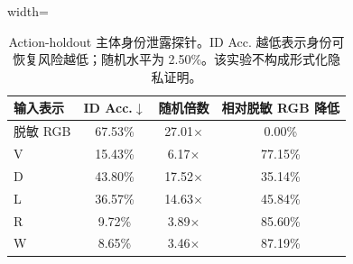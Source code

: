 \begin{table}[H]
\centering
\caption{Action-holdout 主体身份泄露探针。ID Acc. 越低表示身份可恢复风险越低；随机水平为 2.50\%。该实验不构成形式化隐私证明。}
\label{tab:leakage_probe_rebuilt}
\scriptsize
\begin{adjustbox}{width=\linewidth}
\begin{tabular}{lccc}
\toprule
输入表示 & ID Acc.$\downarrow$ & 随机倍数 & 相对脱敏 RGB 降低 \\
\midrule
脱敏 RGB & 67.53\% & 27.01$\times$ & 0.00\% \\
V & 15.43\% & 6.17$\times$ & 77.15\% \\
D & 43.80\% & 17.52$\times$ & 35.14\% \\
L & 36.57\% & 14.63$\times$ & 45.84\% \\
R & 9.72\% & 3.89$\times$ & 85.60\% \\
W & 8.65\% & 3.46$\times$ & 87.19\% \\
\bottomrule
\end{tabular}
\end{adjustbox}
\end{table}
